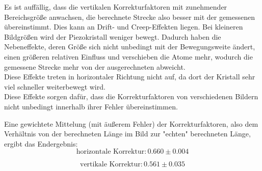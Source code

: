 \documentclass[12pt,a4paper]{article}
\begin{document}
Es ist auffällig, dass die vertikalen Korrekturfaktoren mit zunehmender Bereichsgröße anwachsen, die berechnete Strecke also besser mit der gemessenen übereinstimmt. Dies kann an Drift- und Creep-Effekten liegen. Bei kleineren Bildgrößen wird der Piezokristall weniger bewegt. Dadurch haben die Nebeneffekte, deren Größe sich nicht unbedingt mit der Bewegungsweite ändert, einen größeren relativen Einfluss und verschieben die Atome mehr, wodurch die gemessene Strecke mehr von der ausgerechneten abweicht.\\
Diese Effekte treten in horizontaler Richtung nicht auf, da dort der Kristall sehr viel schneller weiterbewegt wird.\\
Diese Effekte sorgen dafür, dass die Korrekturfaktoren von verschiedenen Bildern nicht unbedingt innerhalb ihrer Fehler übereinstimmen.

Eine gewichtete Mittelung (mit äußerem Fehler) der Korrekturfaktoren, also dem Verhältnis von der berechneten Länge im Bild zur "echten" berechneten Länge, ergibt das Endergebnis:
\begin{equation*}
\boxed{\textrm{horizontale Korrektur}: 0.660\pm 0.004}
\end{equation*}

\begin{equation*}
\boxed{\textrm{vertikale Korrektur}: 0.561\pm 0.035}
\end{equation*}
\end{document}
